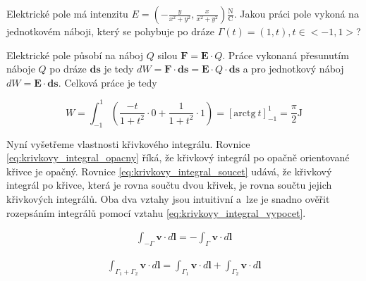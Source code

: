 \documentclass{book}
\newcommand{\vect}[1]{\boldsymbol{#1}}
\begin{document}
Elektrické pole má intenzitu \(E = \left(-\frac{y}{x^2+y^2}, \frac{x}{x^2+y^2}\right) \frac{\mathrm{N}}{\mathrm{C}}\). Jakou práci pole vykoná na jednotkovém náboji, který se pohybuje po dráze \(\Gamma(t) = (1, t), t \in <-1, 1>\)?




Elektrické pole působí na náboj \(Q\) silou \(\vect{F} = \vect{E} \cdot Q\). Práce vykonaná přesunutím náboje \(Q\) po dráze \(\vect{ds}\) je tedy \(dW = \vect{F} \cdot \vect{ds} = \vect{E} \cdot Q \cdot \vect{ds}\) a pro jednotkový náboj \(dW = \vect{E} \cdot \vect{ds}\). Celková práce je tedy

\[
W = \int_{-1}^1 \left (\frac{-t}{1 + t^2} \cdot 0 + \frac{1}{1 + t^2} \cdot 1 \right) = \left[\mathrm{arctg} \ t\right]_{-1}^1 = \frac{\pi}{2} \mathrm{J}
\]

Nyní vyšetřeme vlastnosti křivkového integrálu. Rovnice \eqref{eq:krivkovy_integral_opacny} říká, že křivkový integrál po opačně orientované křivce je opačný. Rovnice \eqref{eq:krivkovy_integral_soucet} udává, že křivkový integrál po křivce, která je rovna součtu dvou křivek, je rovna součtu jejich křivkových integrálů. Oba dva vztahy jsou intuitivní a~lze je snadno ověřit rozepsáním integrálů pomocí vztahu \eqref{eq:krivkovy_integral_vypocet}.

\begin{equation}
\label{eq:krivkovy_integral_opacny}
\begin{split}
\int_{-\Gamma} \vect{v} \cdot d\vect{l} = -\int_{\Gamma} \vect{v} \cdot d\vect{l}
\end{split}
\end{equation}

\begin{equation}
\label{eq:krivkovy_integral_soucet}
\begin{split}
\int_{\Gamma_1 + \Gamma_2} \vect{v} \cdot d\vect{l} = \int_{\Gamma_1} \vect{v} \cdot d\vect{l} + \int_{\Gamma_2} \vect{v} \cdot d\vect{l}
\end{split}
\end{equation}
\end{document}
